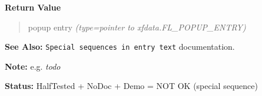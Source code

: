 \begin{boxedminipage}{\funcwidth}
\begin{quote}
      \end{quote}

      \textbf{Return Value}
    \vspace{-1ex}

      \begin{quote}

popup entry
      {\it (type=pointer to xfdata.FL\_POPUP\_ENTRY)}

      \end{quote}

\textbf{See Also:} 
\texttt{Special sequences in entry text} documentation.


\textbf{Note:} 
e.g. \emph{todo}


\textbf{Status:} 
HalfTested + NoDoc + Demo = NOT OK (special sequence)


    \end{boxedminipage}

    \label{xformslib:flselect:fl_replace_select_item}

    \vspace{0.5ex}

